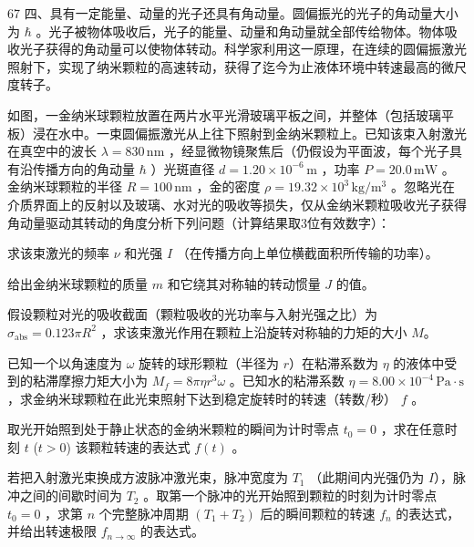 \begin{problem}[33届物理竞赛决赛]{67}
    四、具有一定能量、动量的光子还具有角动量。圆偏振光的光子的角动量大小为 $\hbar$ 。光子被物体吸收后，光子的能量、动量和角动量就全部传给物体。物体吸收光子获得的角动量可以使物体转动。科学家利用这一原理，在连续的圆偏振激光照射下，实现了纳米颗粒的高速转动，获得了迄今为止液体环境中转速最高的微尺度转子。

    如图，一金纳米球颗粒放置在两片水平光滑玻璃平板之间，并整体（包括玻璃平板）浸在水中。一束圆偏振激光从上往下照射到金纳米颗粒上。已知该束入射激光在真空中的波长 $\lambda = 830\,\mathrm{nm}$ ，经显微物镜聚焦后（仍假设为平面波，每个光子具有沿传播方向的角动量 $\hbar$ ）光斑直径 $d = 1.20 \times 10^{-6}\,\mathrm{m}$ ，功率 $P = 20.0\,\mathrm{mW}$ 。金纳米球颗粒的半径 $R = 100\,\mathrm{nm}$ ，金的密度 $\rho = 19.32 \times 10^{3}\,\mathrm{kg/m^{3}}$ 。忽略光在介质界面上的反射以及玻璃、水对光的吸收等损失，仅从金纳米颗粒吸收光子获得角动量驱动其转动的角度分析下列问题（计算结果取3位有效数字）：
    \begin{subproblem}
        求该束激光的频率 $\nu$ 和光强 $I$ （在传播方向上单位横截面积所传输的功率）。
    \end{subproblem}
    \begin{subproblem}
        给出金纳米球颗粒的质量 $m$ 和它绕其对称轴的转动惯量 $J$ 的值。
    \end{subproblem}
    \begin{subproblem}
        假设颗粒对光的吸收截面（颗粒吸收的光功率与入射光强之比）为 $\sigma_{\mathrm{abs}}=0.123\pi R^{2}$ ，求该束激光作用在颗粒上沿旋转对称轴的力矩的大小 $M$。
    \end{subproblem}
    \begin{subproblem}
        已知一个以角速度为 $\omega$ 旋转的球形颗粒（半径为 $r$）在粘滞系数为 $\eta$ 的液体中受到的粘滞摩擦力矩大小为 $M_{f}=8\pi\eta r^{3}\omega$ 。已知水的粘滞系数 $\eta=8.00\times10^{-4}\,\mathrm{Pa\cdot s}$ ，求金纳米球颗粒在此光束照射下达到稳定旋转时的转速（转数/秒） $f$ 。
    \end{subproblem}
    \begin{subproblem}
        取光开始照到处于静止状态的金纳米颗粒的瞬间为计时零点 $t_{0}=0$ ，求在任意时刻 $t$ ($t>0$) 该颗粒转速的表达式 $f(t)$ 。
    \end{subproblem}
    \begin{subproblem}
        若把入射激光束换成方波脉冲激光束，脉冲宽度为 $T_{1}$ （此期间内光强仍为 $I$），脉冲之间的间歇时间为 $T_{2}$ 。取第一个脉冲的光开始照到颗粒的时刻为计时零点 $t_{0}=0$ ，求第 $n$ 个完整脉冲周期 $(T_{1}+T_{2})$ 后的瞬间颗粒的转速 $f_{n}$ 的表达式，并给出转速极限 $f_{n\to\infty}$ 的表达式。
    \end{subproblem}
\end{problem}